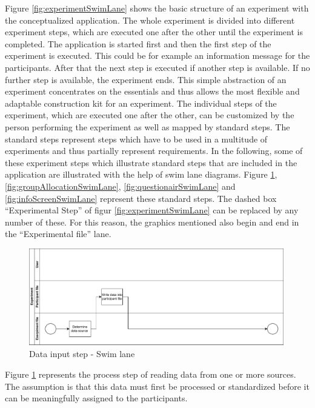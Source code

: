 Figure \ref{fig:experimentSwimLane} shows the basic structure of an experiment with the conceptualized application. The whole experiment is divided into different experiment steps, which are executed one after the other until the experiment is completed. The application is started first and then the first step of the experiment is executed. This could be for example an information message for the participants. After that the next step is executed if another step is available. If no further step is available, the experiment ends. This simple abstraction of an experiment concentrates on the essentials and thus allows the most flexible and adaptable construction kit for an experiment. The individual steps of the experiment, which are executed one after the other, can be customized by the person performing the experiment as well as mapped by standard steps. The standard steps represent steps which have to be used in a multitude of experiments and thus partially represent requirements. In the following, some of these experiment steps which illustrate standard steps that are included in the application are illustrated with the help of swim lane diagrams. Figure \ref{fig:DataInputSwimLane}, \ref{fig:groupAllocationSwimLane}, \ref{fig:questionairSwimLane} and \ref{fig:infoScreenSwimLane} represent these standard steps. The dashed box \enquote{Experimental Step} of figur \ref{fig:experimentSwimLane} can be replaced by any number of these. For this reason, the graphics mentioned also begin and end in the \enquote{Experimental file} lane.

\begin{figure}[htbp]
    \includegraphics[width=0.99\textwidth, keepaspectratio]{content/05_design_and_dev_artefacts/DataInputSwimLane.drawio.pdf}
    \caption{Data input step - Swim lane}    
    \label{fig:DataInputSwimLane}
\end{figure}

Figure \ref{fig:DataInputSwimLane} represents the process step of reading data from one or more sources. The assumption is that this data must first be processed or standardized before it can be meaningfully assigned to the participants.

